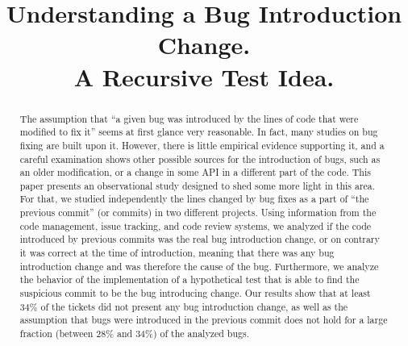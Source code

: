 \documentclass[conference]{IEEEtran}
\begin{document}
\title{Understanding a Bug Introduction Change.\\ A Recursive Test Idea.}


\author{
\and {}
\and {}
}



\maketitle

\begin{abstract}
The assumption that ``a given bug was introduced by the lines of code that were modified to fix it'' seems at first glance very reasonable. In fact, many studies on bug fixing are built upon it. However, there is little empirical evidence supporting it, and a careful examination shows other possible sources for the introduction of bugs, such as an older modification, or a change in some API in a different part of the code.
This paper presents an observational study designed to shed some more light in this area. For that, we studied independently the lines changed by bug fixes as a part of ``the previous commit'' (or commits) in two different projects. Using information from the code management, issue tracking, and code review systems, we analyzed if the code introduced by previous commits was the real bug introduction change, or on contrary it was correct at the time of introduction, meaning that there was any bug introduction change and was therefore the cause of the bug. Furthermore, we analyze the behavior of the implementation of a hypothetical test that is able to find the suspicious commit to be the bug introducing change. Our results show that at least 34\% of the tickets did not present any bug introduction change, as well as the assumption that bugs were introduced in the previous commit does not hold for a large fraction (between 28\% and 34\%) of the analyzed bugs.

\end{abstract}
\end{document}
